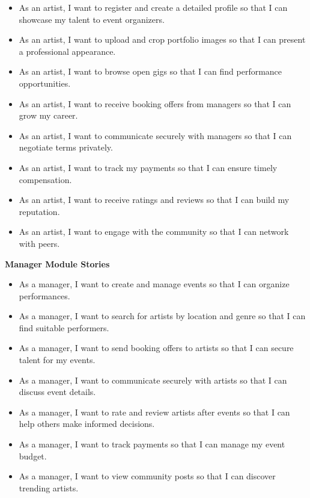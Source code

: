 \documentclass[12pt,a4paper]{report}
\begin{document}
\begin{itemize}

\item As an artist, I want to register and create a detailed profile so that I can showcase my talent to event organizers.

\item As an artist, I want to upload and crop portfolio images so that I can present a professional appearance.

\item As an artist, I want to browse open gigs so that I can find performance opportunities.

\item As an artist, I want to receive booking offers from managers so that I can grow my career.

\item As an artist, I want to communicate securely with managers so that I can negotiate terms privately.

\item As an artist, I want to track my payments so that I can ensure timely compensation.

\item As an artist, I want to receive ratings and reviews so that I can build my reputation.

\item As an artist, I want to engage with the community so that I can network with peers.

\end{itemize}

\textbf{Manager Module Stories}

\begin{itemize}

\item As a manager, I want to create and manage events so that I can organize performances.

\item As a manager, I want to search for artists by location and genre so that I can find suitable performers.

\item As a manager, I want to send booking offers to artists so that I can secure talent for my events.

\item As a manager, I want to communicate securely with artists so that I can discuss event details.

\item As a manager, I want to rate and review artists after events so that I can help others make informed decisions.

\item As a manager, I want to track payments so that I can manage my event budget.

\item As a manager, I want to view community posts so that I can discover trending artists.

\end{itemize}
\end{document}
